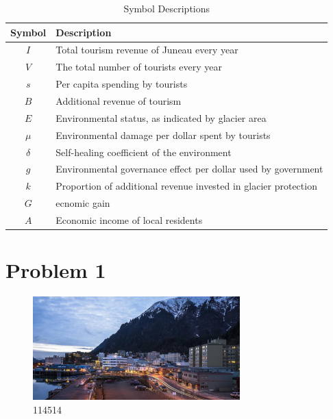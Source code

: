 \documentclass[UTF8]{mcmthesis}
\begin{document}
        \begin{table}[h!]
            \centering
            \begin{tabular}{|c|l|}
            \hline
            \textbf{Symbol} & \textbf{Description} \\ \hline
            $I$        & Total tourism revenue of Juneau every year \\ \hline
            $V$           & The total number of tourists every year \\ \hline
            $s$           & Per capita spending by tourists \\ \hline
            $B$           & Additional revenue of tourism \\ \hline
            $E$             & Environmental status, as indicated by glacier area \\ \hline
            $\mu$             & Environmental damage per dollar spent by tourists \\ \hline
            $\delta$             & Self-healing coefficient of the environment  \\ \hline
            $g$           & Environmental governance effect per dollar used by government \\ \hline
            $k$             & Proportion of additional revenue invested in glacier protection \\ \hline
            $G$        & ecnomic gain \\ \hline
            $A$             & Economic income of local residents \\ \hline
            \end{tabular}
            \caption{Symbol Descriptions}
            \label{tab:symbol_descriptions}
            \end{table}
            

    \section{Problem 1}
    \begin{figure}[htbp]
        \centering
        \includegraphics[width=8cm]{figure1.png}
        \caption{114514}
    \end{figure}
\end{document}
